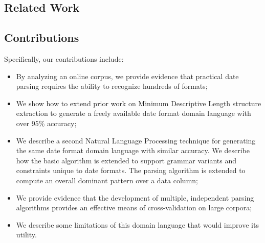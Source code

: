 \subsection{Related Work}


\subsection{Contributions}

Specifically, our contributions include:
\begin{itemize}
\setlength\itemsep{0em}
\item By analyzing an online corpus, we provide evidence that practical date parsing requires the ability to recognize hundreds of formats;
\item We show how to extend prior work on Minimum Descriptive Length structure extraction to generate a freely available date format domain language with over 95\% accuracy;
\item We describe a second Natural Language Processing technique for generating the same date format domain language with similar accuracy. We describe how the basic algorithm is extended to support grammar variants and constraints unique to date formats. The parsing algorithm is extended to compute an overall dominant pattern over a data column;
\item We provide evidence that the development of multiple, independent parsing algorithms provides an effective means of cross-validation on large corpora;
\item We describe some limitations of this domain language that would improve its utility.
\end{itemize}
